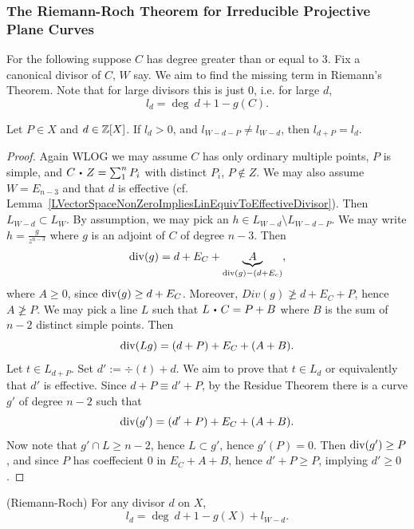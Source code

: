     \subsubsection{The Riemann-Roch Theorem for Irreducible Projective Plane Curves}
    For the following suppose $C$ has degree greater than or equal to $3$. Fix a canonical divisor of $C$, $W$ say. We aim to find the missing term in Riemann's Theorem. Note that for large divisors this is just $0$, i.e. for large $d$,
    $$
        l_d = \deg \ d + 1 -g(C).
    $$
    \begin{lemma}
        Let $P\in X$ and $d\in \mathbb{Z}[X]$. If $l_d>0$, and $l_{W-d-P}\neq l_{W-d}$, then $l_{d+P} = l_d$. 
    \end{lemma}
    \begin{proof}
        Again WLOG we may assume $C$ has only ordinary multiple points, $P$ is simple, and $C\ic Z = \sum_1^n P_i$ with distinct $P_i$, $P\notin Z$. We may also assume $W = E_{n-3}$ and that $d$ is effective (cf. Lemma~\ref{LVectorSpaceNonZeroImpliesLinEquivToEffectiveDivisor}). Then $L_{W-d} \subset L_W$. By assumption, we may pick an $h\in L_{W-d}\setminus L_{W-d-P}$. We may write $h=\frac{g}{z^{n-3}}$ where $g$ is an adjoint of $C$ of degree $n-3$. Then 
        $$
            \mathrm{div}(g) = d + E_C + \underbrace{A}_{\mathrm{div}(g)-(d+E_c)},
        $$
        where $A\geq 0$, since $\mathrm{div}(g)\geq d+E_C$. Moreover, $Div(g)\not\geq d+E_C+P$, hence $A\not\geq P$. We may pick a line $L$ such that $L\ic C = P+ B$ where $B$ is the sum of $n-2$ distinct simple points. Then 
        $$
            \mathrm{div}(Lg) = (d+P)+E_C+(A+B).
        $$ 
        Let $t\in L_{d+P}$. Set $d' := \div(t)+d$. We aim to prove that $t\in L_{d}$ or equivalently that $d'$ is effective. Since $d+P\equiv d'+P$, by the Residue Theorem there is a curve $g'$ of degree $n-2$ such that 
        $$
            \mathrm{div}(g') = (d'+P)+E_C+(A+B).
        $$ 
        Now note that $g'\cap L \geq n-2$, hence $L\subset g'$, hence $g'(P)=0$. Then $\mathrm{div}(g')\geq P$, and since $P$ has coeffecient $0$ in $E_C+A+B$, hence $d'+P\geq P$, implying $d'\geq 0$. 
    \end{proof}
    \begin{theorem}(Riemann-Roch) For any divisor $d$ on $X$, 
        $$
            l_d = \deg \ d +1 -g(X) + l_{W-d}.
        $$
    \end{theorem}
